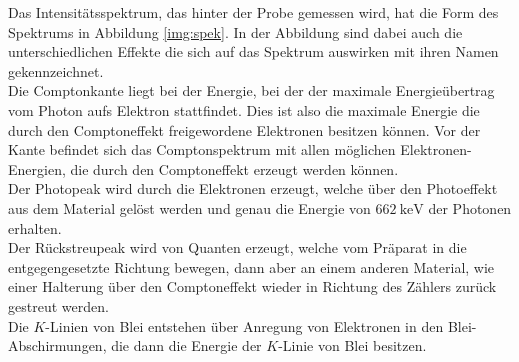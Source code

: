 \noindent
Das Intensitätsspektrum, das hinter der Probe gemessen wird, hat die Form des Spektrums in Abbildung \ref{img:spek}. 
In der Abbildung sind dabei auch die unterschiedlichen Effekte die sich auf das Spektrum auswirken mit ihren Namen gekennzeichnet.\\
Die Comptonkante liegt bei der Energie, bei der der maximale Energieübertrag vom Photon aufs Elektron stattfindet. 
Dies ist also die maximale Energie die durch den Comptoneffekt freigewordene Elektronen besitzen können. 
Vor der Kante befindet sich das Comptonspektrum mit allen möglichen Elektronen-Energien, die durch den Comptoneffekt erzeugt werden können.\\
Der Photopeak wird durch die Elektronen erzeugt, welche über den Photoeffekt aus dem Material gelöst werden und genau die Energie von $\SI{662}{\kilo\electronvolt}$ der Photonen erhalten.\\
Der Rückstreupeak wird von Quanten erzeugt, welche vom Präparat in die entgegengesetzte Richtung bewegen, dann aber an einem anderen Material, wie einer Halterung über den Comptoneffekt wieder in Richtung des Zählers zurück gestreut werden.\\
Die $K$-Linien von Blei entstehen über Anregung von Elektronen in den Blei-Abschirmungen, die dann die Energie der $K$-Linie von Blei besitzen.

